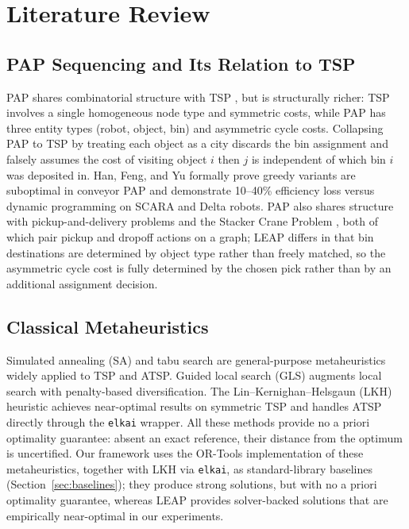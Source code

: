 \documentclass[review,times]{elsarticle}
\begin{document}
\section{Literature Review}\label{sec:lit}

\subsection{PAP Sequencing and Its Relation to TSP}

PAP shares combinatorial structure with TSP \cite{dantzig1954}, but is structurally richer: TSP involves a single homogeneous node type and symmetric costs, while PAP has three entity types (robot, object, bin) and asymmetric cycle costs. Collapsing PAP to TSP by treating each object as a city discards the bin assignment and falsely assumes the cost of visiting object $i$ then $j$ is independent of which bin $i$ was deposited in. Han, Feng, and Yu \cite{han2020pap} formally prove greedy variants are suboptimal in conveyor PAP and demonstrate 10--40\% efficiency loss versus dynamic programming on SCARA and Delta robots. PAP also shares structure with pickup-and-delivery problems \cite{savelsbergh1995pdp} and the Stacker Crane Problem \cite{frederickson1978sc}, both of which pair pickup and dropoff actions on a graph; LEAP differs in that bin destinations are determined by object type rather than freely matched, so the asymmetric cycle cost is fully determined by the chosen pick rather than by an additional assignment decision.

\subsection{Classical Metaheuristics}

Simulated annealing (SA) \cite{kirkpatrick1983sa} and tabu search \cite{glover1989tabu} are general-purpose metaheuristics widely applied to TSP and ATSP. Guided local search (GLS) \cite{voudouris2003gls} augments local search with penalty-based diversification. The Lin--Kernighan--Helsgaun (LKH) heuristic \cite{helsgaun2000lkh} achieves near-optimal results on symmetric TSP and handles ATSP directly through the \texttt{elkai} wrapper. All these methods provide no a priori optimality guarantee: absent an exact reference, their distance from the optimum is uncertified. Our framework uses the OR-Tools implementation \cite{ortools} of these metaheuristics, together with LKH via \texttt{elkai}, as standard-library baselines (Section~\ref{sec:baselines}); they produce strong solutions, but with no a priori optimality guarantee, whereas LEAP provides solver-backed solutions that are empirically near-optimal in our experiments.
\end{document}
